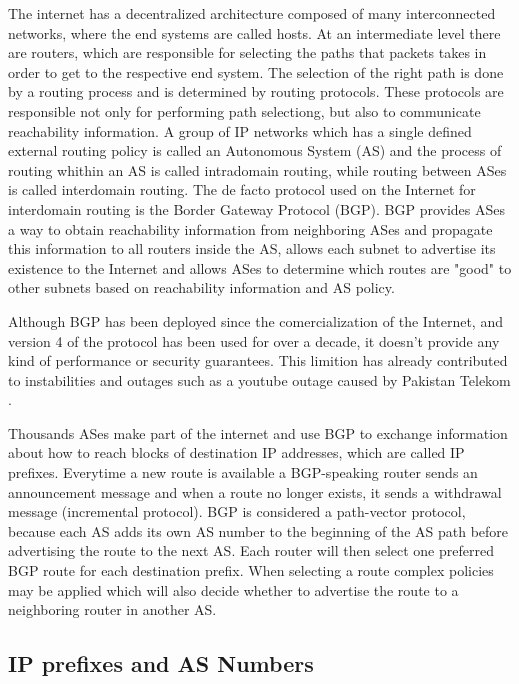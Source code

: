 \documentclass[11pt,a4paper]{scrreprt}
\begin{document}
The internet has a decentralized architecture composed of many interconnected networks, where the end systems are called hosts. At an intermediate level there are routers, which are responsible for selecting the paths that packets takes in order to get to the respective end system. The selection of the right path is done by a routing process and is determined by routing protocols. These protocols are responsible not only for performing path selectiong, but also to communicate reachability information. A group of IP networks which has a single defined external routing policy is called an Autonomous System (AS) and the process of routing whithin an AS is called intradomain routing, while routing between ASes is called interdomain routing. The de facto protocol used on the Internet for interdomain routing is the Border Gateway Protocol (BGP). BGP provides ASes a way to obtain reachability information from neighboring ASes and propagate this information to all routers inside the AS, allows each subnet to advertise its existence to the Internet and allows ASes to determine which routes are "good" to other subnets based on reachability information and AS policy.

Although BGP has been deployed since the comercialization of the Internet, and version 4 of the protocol has been used for over a decade, it doesn't provide any kind of performance or security guarantees. This limition has already contributed to instabilities and outages \cite{Misdirection} such as a youtube outage caused by Pakistan Telekom \cite{Pakistan}. 

	Thousands ASes make part of the internet and use BGP to exchange information about how to reach blocks of destination IP addresses, which are called IP prefixes. Everytime a new route is available a BGP-speaking router sends an announcement message and when a route no longer exists, it sends a withdrawal message (incremental protocol). BGP is considered a path-vector protocol, because each AS adds its own AS number to the beginning of the AS path before advertising the route to the next AS. Each router will then select one preferred BGP route for each destination prefix. When selecting a route complex policies may be applied which will also decide whether to advertise the route to a neighboring router in another AS.   

\subsection{IP prefixes and AS Numbers}
	
\end{document}
